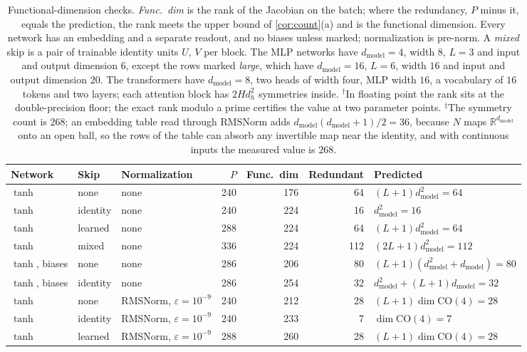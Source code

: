\documentclass[10pt]{article}
\theoremstyle{definition}
\theoremstyle{remark}
\newcommand{\R}{\mathbb{R}}
\newcommand{\dm}{d_{\mathrm{model}}}
\newcommand{\CO}{\mathrm{CO}}
\begin{document}
\begin{table}[ht]
\centering\footnotesize\setlength{\tabcolsep}{2pt}
\caption{Functional-dimension checks. \emph{Func.\ dim} is the rank of the Jacobian on the batch; where the redundancy, $P$ minus it, equals the prediction, the rank meets the upper bound of \cref{cor:count}(a) and is the functional dimension. Every network has an embedding and a separate readout, and no biases unless marked; normalization is pre-norm. A \emph{mixed} skip is a pair of trainable identity units $U$, $V$ per block. The MLP networks have $\dm = 4$, width $8$, $L = 3$ and input and output dimension $6$, except the rows marked \emph{large}, which have $\dm = 16$, $L = 6$, width $16$ and input and output dimension $20$. The transformers have $\dm = 8$, two heads of width four, MLP width $16$, a vocabulary of $16$ tokens and two layers; each attention block has $2Hd_h^2$ symmetries inside. $^\dagger$In floating point the rank sits at the double-precision floor; the exact rank modulo a prime certifies the value at two parameter points. $^\ddagger$The symmetry count is $268$; an embedding table read through RMSNorm adds $\dm(\dm+1)/2 = 36$, because $N$ maps $\R^{\dm}$ onto an open ball, so the rows of the table can absorb any invertible map near the identity, and with continuous inputs the measured value is $268$.}
\label{tab:checks}
\begin{tabular}{@{}lllrrrl@{}}
\toprule
Network & Skip & Normalization & $P$ & Func.\ dim & Redundant & Predicted \\
\midrule
$\tanh$ & none & none & 240 & 176 & 64 & $(L{+}1)\dm^2 = 64$ \\
$\tanh$ & identity & none & 240 & 224 & 16 & $\dm^2 = 16$ \\
$\tanh$ & learned & none & 288 & 224 & 64 & $(L{+}1)\dm^2 = 64$ \\
$\tanh$ & mixed & none & 336 & 224 & 112 & $(2L{+}1)\dm^2 = 112$ \\
$\tanh$, biases & none & none & 286 & 206 & 80 & $(L{+}1)(\dm^2{+}\dm) = 80$ \\
$\tanh$, biases & identity & none & 286 & 254 & 32 & $\dm^2 + (L{+}1)\dm = 32$ \\
\addlinespace
$\tanh$ & none & RMSNorm, $\varepsilon = 10^{-9}$ & 240 & 212 & 28 & $(L{+}1)\dim\CO(4) = 28$ \\
$\tanh$ & identity & RMSNorm, $\varepsilon = 10^{-9}$ & 240 & 233 & 7 & $\dim\CO(4) = 7$ \\
$\tanh$ & learned & RMSNorm, $\varepsilon = 10^{-9}$ & 288 & 260 & 28 & $(L{+}1)\dim\CO(4) = 28$ \\

\end{tabular}
\end{table}
\end{document}
